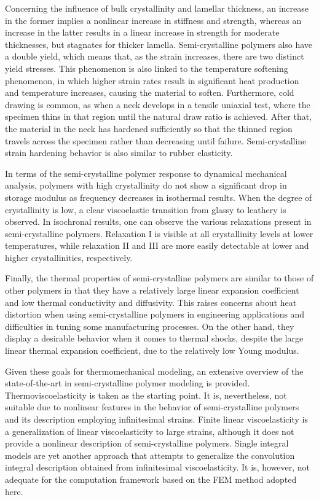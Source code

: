 Concerning the influence of bulk crystallinity and lamellar thickness, an increase in the former implies a nonlinear increase in stiffness and strength, whereas an increase in the latter results in a linear increase in strength for moderate thicknesses, but stagnates for thicker lamella.
Semi-crystalline polymers also have a double yield, which means that, as the strain increases, there are two distinct yield stresses.
This phenomenon is also linked to the temperature softening phenomenon, in which higher strain rates result in significant heat production and temperature increases, causing the material to soften.
Furthermore, cold drawing is common, as when a neck develops in a tensile uniaxial test, where the specimen thins in that region until the natural draw ratio is achieved.
After that, the material in the neck has hardened sufficiently so that the thinned region travels across the specimen rather than decreasing until failure.
Semi-crystalline strain hardening behavior is also similar to rubber elasticity.

In terms of the semi-crystalline polymer response to dynamical mechanical analysis, polymers with high crystallinity do not show a significant drop in storage modulus as frequency decreases in isothermal results.
When the degree of crystallinity is low, a clear viscoelastic transition from glassy to leathery is observed.
In isochronal results, one can observe the various relaxations present in semi-crystalline polymers.
Relaxation I is visible at all crystallinity levels at lower temperatures, while relaxation II and III are more easily detectable at lower and higher crystallinities, respectively.

Finally, the thermal properties of semi-crystalline polymers are similar to those of other polymers in that they have a relatively large linear expansion coefficient and low thermal conductivity and diffusivity.
This raises concerns about heat distortion when using semi-crystalline polymers in engineering applications and difficulties in tuning some manufacturing processes.
On the other hand, they display a desirable behavior when it comes to thermal shocks, despite the large linear thermal expansion coefficient, due to the relatively low Young modulus.
\enlargethispage{\baselineskip}

Given these goals for thermomechanical modeling, an extensive overview of the state-of-the-art in semi-crystalline polymer modeling is provided.
Thermoviscoelasticity is taken as the starting point.
It is, nevertheless, not suitable due to nonlinear features in the behavior of semi-crystalline polymers and its description employing infinitesimal strains.
Finite linear viscoelasticity is a generalization of linear viscoelasticity to large strains, although it does not provide a nonlinear description of semi-crystalline polymers.
Single integral models are yet another approach that attempts to generalize the convolution integral description obtained from infinitesimal viscoelasticity.
It is, however, not adequate for the computation framework based on the FEM method adopted here.

